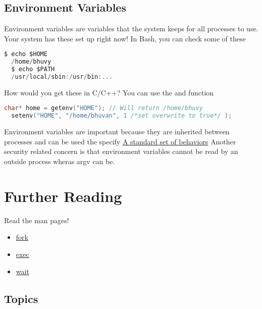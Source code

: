 \subsection{Environment Variables}

Environment variables are variables that the system keeps for all processes to use.
Your system has these set up right now!
In Bash, you can check some of these

\begin{lstlisting}[language=C]
  $ echo $HOME
  /home/bhuvy
  $ echo $PATH
  /usr/local/sbin:/usr/bin:...
\end{lstlisting}

How would you get these in C/C++? You can use the  and  function

\begin{lstlisting}[language=C]
  char* home = getenv("HOME"); // Will return /home/bhuvy
  setenv("HOME", "/home/bhuvan", 1 /*set overwrite to true*/ );
\end{lstlisting}

Environment variables are important because they are inherited between processes and can be used the specify \href{https://pubs.opengroup.org/onlinepubs/9699919799/basedefs/V1_chap08.html}{A standard set of behaviors}
Another security related concern is that environment variables cannot be read by an outside process wheras argv can be.

\section{Further Reading}

Read the man pages! 
\begin{itemize}
\item \href{http://man7.org/linux/man-pages/man2/fork.2.html}{fork} 
\item \href{http://man7.org/linux/man-pages/man3/exec.3.html}{exec} 
\item \href{http://man7.org/linux/man-pages/man2/wait.2.html}{wait}
\end{itemize}

\subsection{Topics}

